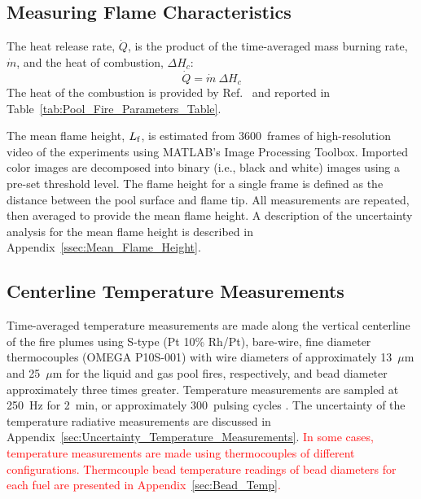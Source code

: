 \documentclass[12pt]{article}
\begin{document}
\subsection{Measuring Flame Characteristics}
\label{ssec:Flame_Characteristics_Measurements}

The heat release rate, $\dot{Q}$, is the product of the time-averaged mass burning rate, $\dot{m}$, and the heat of combustion, $\Delta H_{c}$:
\begin{equation}\label{eq:Heat_release_rate}
\dot{Q}= \dot{m}~\Delta H_{c}
\end{equation}
The heat of the combustion is provided by Ref.~\cite{Dippr} and reported in Table~\ref{tab:Pool_Fire_Parameters_Table}.

The mean flame height, $L_{\rm{f}}$, is estimated from 3600~frames of high-resolution video of the experiments using MATLAB’s Image Processing Toolbox. Imported color images are decomposed into binary (i.e., black and white) images using a pre-set threshold level. The flame height for a single frame is defined as the distance between the pool surface and flame tip. All measurements are repeated, then averaged to provide the mean flame height. A description of the uncertainty analysis for the mean flame height is described in Appendix~\ref{ssec:Mean_Flame_Height}.

\subsection{Centerline Temperature Measurements}
\label{ssec:Temperature_Measurements}

Time-averaged temperature measurements are made along the vertical centerline of the fire plumes using S-type (Pt 10\% Rh/Pt), bare-wire, fine diameter thermocouples (OMEGA P10S-001) with wire diameters of approximately 13~$\mu$m and 25~$\mu$m for the liquid and gas pool fires, respectively, and bead diameter approximately three times greater. Temperature measurements are sampled at \SI{250}{Hz} for \SI{2}{min}, or approximately 300~pulsing cycles \cite{Wang2019}. The uncertainty of the temperature radiative measurements are discussed in Appendix~\ref{sec:Uncertainty_Temperature_Measurements}. \textcolor{red}{In some cases, temperature measurements are made using thermocouples of different configurations. Thermcouple bead temperature readings of bead diameters for each fuel are presented in Appendix~\ref{sec:Bead_Temp}.}
\end{document}
